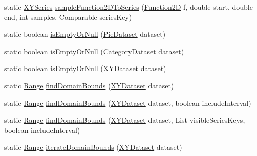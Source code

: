 \begin{DoxyCompactItemize}
\item 
static \mbox{\hyperlink{classorg_1_1jfree_1_1data_1_1xy_1_1_x_y_series}{X\+Y\+Series}} \mbox{\hyperlink{classorg_1_1jfree_1_1data_1_1general_1_1_dataset_utilities_a71b37cad0c6d11a0455cce6d606c9b38}{sample\+Function2\+D\+To\+Series}} (\mbox{\hyperlink{interfaceorg_1_1jfree_1_1data_1_1function_1_1_function2_d}{Function2D}} f, double start, double end, int samples, Comparable series\+Key)
\item 
static boolean \mbox{\hyperlink{classorg_1_1jfree_1_1data_1_1general_1_1_dataset_utilities_aa858b6bb33cc8a674c09f2c6164fb6f1}{is\+Empty\+Or\+Null}} (\mbox{\hyperlink{interfaceorg_1_1jfree_1_1data_1_1general_1_1_pie_dataset}{Pie\+Dataset}} dataset)
\item 
static boolean \mbox{\hyperlink{classorg_1_1jfree_1_1data_1_1general_1_1_dataset_utilities_a12652e22fed207b04f936204e6a2d667}{is\+Empty\+Or\+Null}} (\mbox{\hyperlink{interfaceorg_1_1jfree_1_1data_1_1category_1_1_category_dataset}{Category\+Dataset}} dataset)
\item 
static boolean \mbox{\hyperlink{classorg_1_1jfree_1_1data_1_1general_1_1_dataset_utilities_ad3aaf954dd43f89d5c3b18f535532fa3}{is\+Empty\+Or\+Null}} (\mbox{\hyperlink{interfaceorg_1_1jfree_1_1data_1_1xy_1_1_x_y_dataset}{X\+Y\+Dataset}} dataset)
\item 
static \mbox{\hyperlink{classorg_1_1jfree_1_1data_1_1_range}{Range}} \mbox{\hyperlink{classorg_1_1jfree_1_1data_1_1general_1_1_dataset_utilities_aec9ad9fc9eeff78df3d1f9ad1b7c753e}{find\+Domain\+Bounds}} (\mbox{\hyperlink{interfaceorg_1_1jfree_1_1data_1_1xy_1_1_x_y_dataset}{X\+Y\+Dataset}} dataset)
\item 
static \mbox{\hyperlink{classorg_1_1jfree_1_1data_1_1_range}{Range}} \mbox{\hyperlink{classorg_1_1jfree_1_1data_1_1general_1_1_dataset_utilities_a0841a95a5e3f28ef32ce8ff8366370dc}{find\+Domain\+Bounds}} (\mbox{\hyperlink{interfaceorg_1_1jfree_1_1data_1_1xy_1_1_x_y_dataset}{X\+Y\+Dataset}} dataset, boolean include\+Interval)
\item 
static \mbox{\hyperlink{classorg_1_1jfree_1_1data_1_1_range}{Range}} \mbox{\hyperlink{classorg_1_1jfree_1_1data_1_1general_1_1_dataset_utilities_ae124faf1d4e65a6caff335960777df3f}{find\+Domain\+Bounds}} (\mbox{\hyperlink{interfaceorg_1_1jfree_1_1data_1_1xy_1_1_x_y_dataset}{X\+Y\+Dataset}} dataset, List visible\+Series\+Keys, boolean include\+Interval)
\item 
static \mbox{\hyperlink{classorg_1_1jfree_1_1data_1_1_range}{Range}} \mbox{\hyperlink{classorg_1_1jfree_1_1data_1_1general_1_1_dataset_utilities_a6b1bcd84440a9f1b9b2af473f91aae40}{iterate\+Domain\+Bounds}} (\mbox{\hyperlink{interfaceorg_1_1jfree_1_1data_1_1xy_1_1_x_y_dataset}{X\+Y\+Dataset}} dataset)

\end{DoxyCompactItemize}
